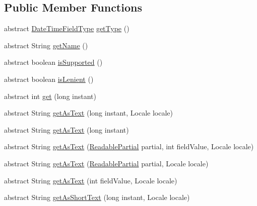 \subsection*{Public Member Functions}
\begin{DoxyCompactItemize}
\item 
abstract \hyperlink{classorg_1_1joda_1_1time_1_1_date_time_field_type}{Date\-Time\-Field\-Type} \hyperlink{classorg_1_1joda_1_1time_1_1_date_time_field_ac7fc2d14d6b7cf5d6d11447c36fb1708}{get\-Type} ()
\item 
abstract String \hyperlink{classorg_1_1joda_1_1time_1_1_date_time_field_a04885824869b8cfd50eef6719e73fa79}{get\-Name} ()
\item 
abstract boolean \hyperlink{classorg_1_1joda_1_1time_1_1_date_time_field_ae7bc50d8b6f47eeb3dc93407bc66221e}{is\-Supported} ()
\item 
abstract boolean \hyperlink{classorg_1_1joda_1_1time_1_1_date_time_field_ae3e7156e3590227cb0df0e9d6d7f0e3c}{is\-Lenient} ()
\item 
abstract int \hyperlink{classorg_1_1joda_1_1time_1_1_date_time_field_a7a5ffec3a53f1a78db5d2503a31e3047}{get} (long instant)
\item 
abstract String \hyperlink{classorg_1_1joda_1_1time_1_1_date_time_field_a064b8ada6cae9bc9cacd7f957601ee3e}{get\-As\-Text} (long instant, Locale locale)
\item 
abstract String \hyperlink{classorg_1_1joda_1_1time_1_1_date_time_field_af333b1954f746ee6597fa43055a34e1d}{get\-As\-Text} (long instant)
\item 
abstract String \hyperlink{classorg_1_1joda_1_1time_1_1_date_time_field_af2daf1d1fca97c6b3c341b7d4b170ceb}{get\-As\-Text} (\hyperlink{interfaceorg_1_1joda_1_1time_1_1_readable_partial}{Readable\-Partial} partial, int field\-Value, Locale locale)
\item 
abstract String \hyperlink{classorg_1_1joda_1_1time_1_1_date_time_field_a451753c3f43b30c30adfa06403c8a021}{get\-As\-Text} (\hyperlink{interfaceorg_1_1joda_1_1time_1_1_readable_partial}{Readable\-Partial} partial, Locale locale)
\item 
abstract String \hyperlink{classorg_1_1joda_1_1time_1_1_date_time_field_a2ba97cf7b0fd7c98ab35ec74a375e9da}{get\-As\-Text} (int field\-Value, Locale locale)
\item 
abstract String \hyperlink{classorg_1_1joda_1_1time_1_1_date_time_field_a23c7d725d07b29a96163df00ece6db6d}{get\-As\-Short\-Text} (long instant, Locale locale)
\item 

\end{DoxyCompactItemize}

